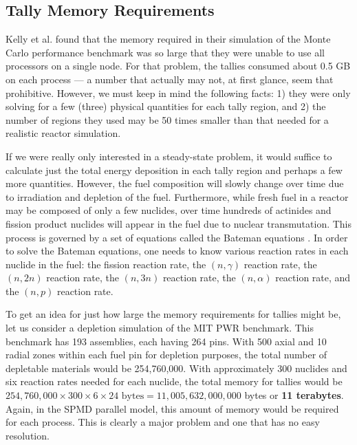 \subsection{Tally Memory Requirements}

Kelly et al. \cite{physor-kelly-2012} found that the memory required in their
simulation of the Monte Carlo performance benchmark was so large that they were
unable to use all processors on a single node. For that problem, the tallies
consumed about 0.5 GB on each process --- a number that actually may not, at
first glance, seem that prohibitive. However, we must keep in mind the following
facts: 1) they were only solving for a few (three) physical quantities for each
tally region, and 2) the number of regions they used may be 50 times smaller
than that needed for a realistic reactor simulation.

If we were really only interested in a steady-state problem, it would suffice to
calculate just the total energy deposition in each tally region and perhaps a
few more quantities. However, the fuel composition will slowly change over time
due to irradiation and depletion of the fuel. Furthermore, while fresh fuel in a
reactor may be composed of only a few nuclides, over time hundreds of actinides
and fission product nuclides will appear in the fuel due to nuclear
transmutation. This process is governed by a set of equations called the Bateman
equations \cite{ane-cetnar-2006}. In order to solve the Bateman equations, one
needs to know various reaction rates in each nuclide in the fuel: the fission
reaction rate, the $(n,\gamma)$ reaction rate, the $(n,2n)$ reaction rate, the
$(n,3n)$ reaction rate, the $(n,\alpha)$ reaction rate, and the $(n,p)$ reaction
rate.

To get an idea for just how large the memory requirements for tallies might be,
let us consider a depletion simulation of the MIT PWR benchmark. This benchmark
has 193 assemblies, each having 264 pins. With 500 axial and 10 radial zones
within each fuel pin for depletion purposes, the total number of depletable
materials would be 254,760,000. With approximately 300 nuclides and six reaction
rates needed for each nuclide, the total memory for tallies would be
$254,760,000 \times 300 \times 6 \times 24 \text{ bytes} = 11,005,632,000,000$
bytes or \textbf{11 terabytes}. Again, in the SPMD parallel model, this amount
of memory would be required for each process. This is clearly a major problem
and one that has no easy resolution.

